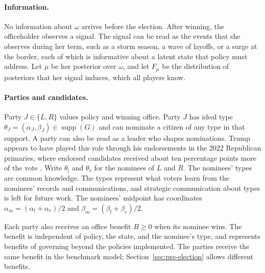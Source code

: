 \documentclass[12pt,letterpaper]{article}
\begin{document}
\paragraph{Information.}
No information about $\omega$ arrives before the election. After winning, the officeholder observes a signal. The signal can be read as the events that she observes during her term, such as a storm season, a wave of layoffs, or a surge at the border, each of which is informative about a latent state that policy must address. Let $\mu$ be her posterior over $\omega$, and let $F_\mu$ be the distribution of posteriors that her signal induces, which all players know.

\paragraph{Parties and candidates.}
Party $J\in\{L,R\}$ values policy and winning office. Party $J$ has ideal type $\theta_J=(\alpha_J,\beta_J)\in\operatorname{supp}(G)$ and can nominate a citizen of any type in that support. A party can also be read as a leader who shapes nominations. Trump appears to have played this role through his endorsements in the 2022 Republican primaries, where endorsed candidates received about ten percentage points more of the vote \citep{BlumCowburnMasket2024}. Write $\theta_l$ and $\theta_r$ for the nominees of $L$ and $R$. The nominees' types are common knowledge. The types represent what voters learn from the nominees' records and communications, and strategic communication about types is left for future work. The nominees' midpoint has coordinates $\alpha_m=(\alpha_l+\alpha_r)/2$ and $\beta_m=(\beta_l+\beta_r)/2$.

Each party also receives an office benefit $B\ge0$ when its nominee wins. The benefit is independent of policy, the state, and the nominee's type, and represents benefits of governing beyond the policies implemented. The parties receive the same benefit in the benchmark model; Section~\ref{sec:pre-election} allows different benefits.
\end{document}
